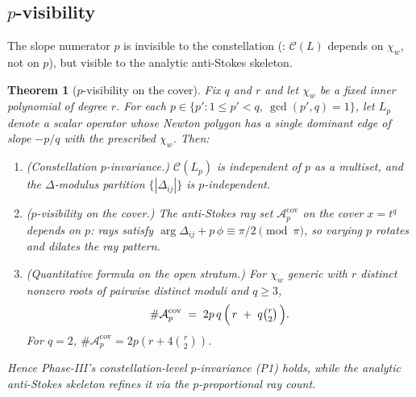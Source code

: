 \documentclass[aip,jmp,preprint,amsmath,amssymb,nofootinbib,floatfix]{revtex4-2}
\theoremstyle{plain}
\newtheorem{theorem}{Theorem}[section]
\theoremstyle{definition}
\theoremstyle{remark}
\newcommand{\Cl}{\mathcal{C}}
\newcommand{\Acov}{\mathcal{A}^{\mathrm{cov}}}
\newcommand{\Dij}{\Delta_{ij}}
\DeclareMathOperator{\arginline}{arg}
\begin{document}
\subsection{\texorpdfstring{$p$-visibility}{p-visibility}}\label{ssec:AT7}

The slope numerator $p$ is invisible to the constellation
(: $\Cl(L)$ depends on $\chi_w$, not on $p$), but
visible to the analytic anti-Stokes skeleton.

\begin{theorem}[$p$-visibility on the cover]\label{thm:AT7}
Fix $q$ and $r$ and let $\chi_w$ be a fixed inner polynomial of degree
$r$. For each $p \in \{p' : 1 \le p' < q,\ \gcd(p', q) = 1\}$, let $L_p$
denote a scalar operator whose Newton polygon has a single dominant edge
of slope $-p/q$ with the prescribed $\chi_w$. Then:
\begin{enumerate}[leftmargin=2em]
\item (Constellation $p$-invariance.) $\Cl(L_p)$ is independent of $p$ as
      a multiset, and the $\Delta$-modulus partition $\{|\Dij|\}$ is
      $p$-independent.
\item ($p$-visibility on the cover.) The anti-Stokes ray set $\Acov_p$
      on the cover $x = t^q$ \emph{depends} on $p$: rays satisfy
      $\arginline \Dij + p\, \phi \equiv \pi/2 \pmod{\pi}$, so varying $p$
      rotates and dilates the ray pattern.
\item (Quantitative formula on the open stratum.) For $\chi_w$ generic
      with $r$ distinct nonzero roots of pairwise distinct moduli and
      $q \ge 3$,
      \[
        \#\Acov_p
        \;=\;
        2 p\, q\, \Big(\, r \;+\; q \tbinom{r}{2}\,\Big).
      \]
      For $q = 2$, $\#\Acov_p = 2 p (r + 4 \binom{r}{2})$.
\end{enumerate}
Hence Phase-III's constellation-level $p$-invariance (P1) holds, while
the analytic anti-Stokes skeleton refines it via the
$p$-proportional ray count.
\end{theorem}
\end{document}
